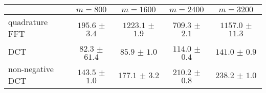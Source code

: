 \centering
\renewcommand{\arraystretch}{1.2}
\begin{tabular}{@{}lcccc@{}}
\toprule
 & $m=800$ & $m=1600$ & $m=2400$ & $m=3200$\\
\midrule
quadrature FFT & $195.6$ $\pm$ $3.4$ & $1223.1$ $\pm$ $1.9$ & $709.3$ $\pm$ $2.1$ & $1157.0$ $\pm$ $11.3$ \\
DCT & $82.3$ $\pm$ $61.4$ & $85.9$ $\pm$ $1.0$ & $114.0$ $\pm$ $0.4$ & $141.0$ $\pm$ $0.9$ \\
non-negative DCT & $143.5$ $\pm$ $1.0$ & $177.1$ $\pm$ $3.2$ & $210.2$ $\pm$ $0.8$ & $238.2$ $\pm$ $1.0$ \\
\bottomrule
\end{tabular}
